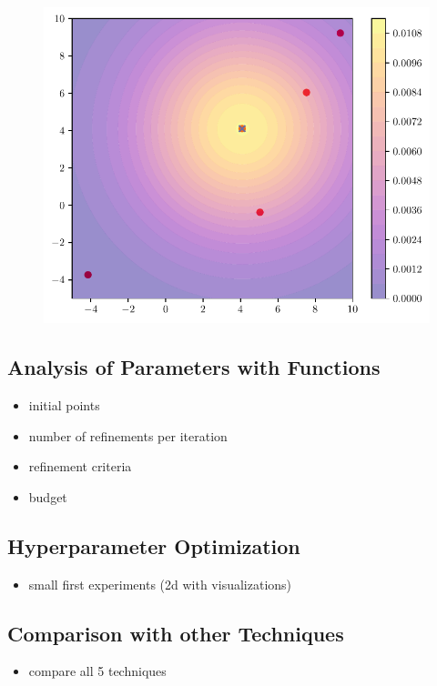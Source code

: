 \begin{figure}[htbp!]
	\centering
	\includegraphics[scale=0.8]{figures/Adaptive_random/Visualizations/Alternative_3}
	\caption{  }
	\label{fig:alternative_3}
\end{figure}


\subsection{Analysis of Parameters with Functions}

\begin{itemize}
	\item initial points
	\item number of refinements per iteration
	\item refinement criteria
	\item budget
\end{itemize}

\subsection{Hyperparameter Optimization}

\begin{itemize}
	\item small first experiments (2d with visualizations)
\end{itemize}

\subsection{Comparison with other Techniques}

\begin{itemize}
	\item compare all 5 techniques
\end{itemize}








